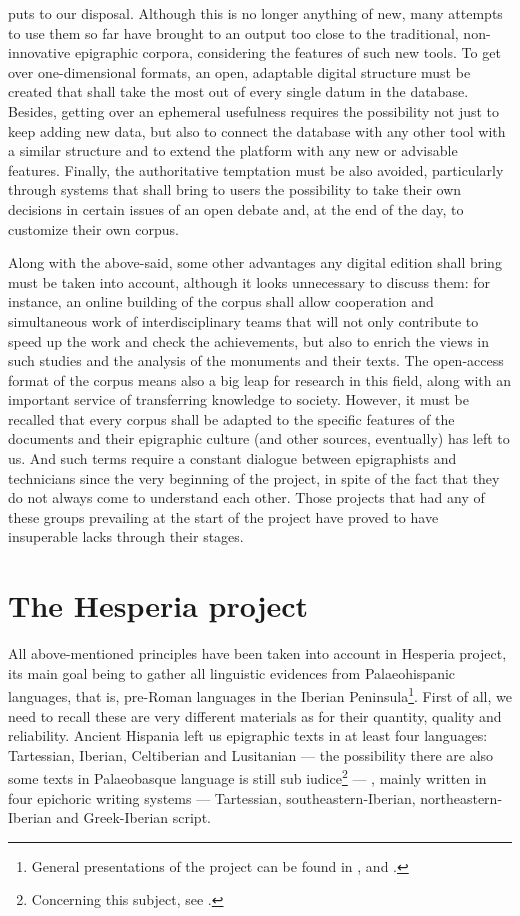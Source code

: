 \documentclass[amsthm,ebook]{saparticle}
\begin{document}
puts to our disposal. Although this is no longer anything of new, many attempts to use them so far have brought to an
output too close to the traditional, non-innovative epigraphic corpora, considering the features of such new tools. To
get over one-dimensional formats, an open, adaptable digital structure must be created that shall take the most out of
every single datum in the database. Besides, getting over an ephemeral usefulness requires the possibility not just to
keep adding new data, but also to connect the database with any other tool with a similar structure and to extend the
platform with any new or advisable features. Finally, the authoritative temptation must be also avoided, particularly
through systems that shall bring to users the possibility to take their own decisions in certain issues of an open
debate and, at the end of the day, to customize their own corpus.

Along with the above-said, some other advantages any digital edition shall bring must be taken into account, although it
looks unnecessary to discuss them: for instance, an online building of the corpus shall allow cooperation and
simultaneous work of interdisciplinary teams that will not only contribute to speed up the work and check the
achievements, but also to enrich the views in such studies and the analysis of the monuments and their texts. The
open-access format of the corpus means also a big leap for research in this field, along with an important service of
transferring knowledge to society. However, it must be recalled that every corpus shall be adapted to the specific
features of the documents and their epigraphic culture (and other sources, eventually) has left to us. And such terms
require a constant dialogue between epigraphists and technicians since the very beginning of the project, in spite of
the fact that they do not always come to understand each other. Those projects that had any of these groups prevailing
at the start of the project have proved to have insuperable lacks through their stages. 

\section{The Hesperia project}


\noindent All above-mentioned principles have been taken into account in Hesperia project, its main goal being to gather all
linguistic evidences from Palaeohispanic languages, that is, pre-Roman languages in the Iberian Peninsula\footnote{
General presentations of the project can be found in \citet{orduna_implementing_????}, \citet{orduna_philology_????} and
\citet{velaza_hesperia:_2014}.}. First of all, we need to recall these are very different materials as for their quantity, quality and
reliability. Ancient Hispania left us epigraphic texts in at least four languages: Tartessian, Iberian, Celtiberian and
Lusitanian --- the possibility there are also some texts in Palaeobasque language is still sub iudice\footnote{
Concerning this subject, see \citet{velaza_epigrafiy_2009}.} --- , mainly written in four epichoric writing systems --- Tartessian,
southeastern-Iberian, northeastern-Iberian and Greek-Iberian script. 
\end{document}
